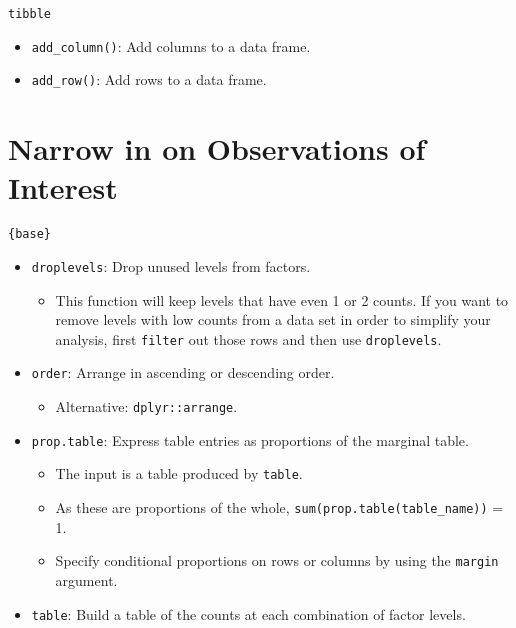 \documentclass[
]{book}
\providecommand{\tightlist}{%
  \setlength{\itemsep}{0pt}\setlength{\parskip}{0pt}}
\begin{document}
\texttt{tibble}

\begin{itemize}
\tightlist
\item
  \texttt{add\_column()}: Add columns to a data frame.
\item
  \texttt{add\_row()}: Add rows to a data frame.
\end{itemize}

\hypertarget{narrow-in-on-observations-of-interest}{%
\section{Narrow in on Observations of Interest}\label{narrow-in-on-observations-of-interest}}

\texttt{\{base\}}

\begin{itemize}
\tightlist
\item
  \texttt{droplevels}: Drop unused levels from factors.

  \begin{itemize}
  \tightlist
  \item
    This function will keep levels that have even 1 or 2 counts. If you want to remove levels with low counts from a data set in order to simplify your analysis, first \texttt{filter} out those rows and then use \texttt{droplevels}.
  \end{itemize}
\item
  \texttt{order}: Arrange in ascending or descending order.

  \begin{itemize}
  \tightlist
  \item
    Alternative: \texttt{dplyr::arrange}.
  \end{itemize}
\item
  \texttt{prop.table}: Express table entries as proportions of the marginal table.

  \begin{itemize}
  \tightlist
  \item
    The input is a table produced by \texttt{table}.
  \item
    As these are proportions of the whole, \texttt{sum(prop.table(table\_name))} = 1.
  \item
    Specify conditional proportions on rows or columns by using the \texttt{margin} argument.
  \end{itemize}
\item
  \texttt{table}: Build a table of the counts at each combination of factor levels.


\end{itemize}
\end{document}
